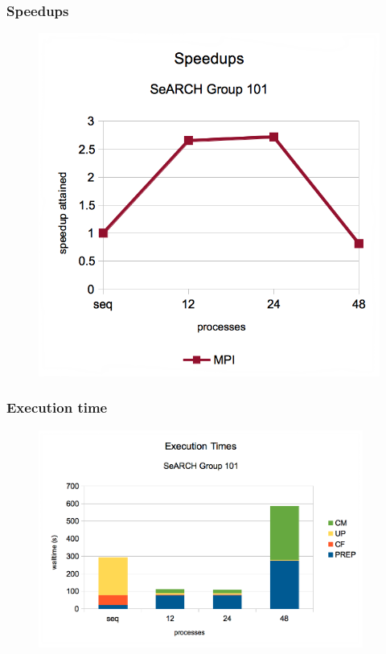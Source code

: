 \documentclass{beamer}
\begin{document}
\begin{frame}
	\frametitle{Speedups}
	\begin{figure}
		\begin{center}
			\includegraphics[height=\textheight]{images/may/speedups.png}
		\end{center}
	\end{figure}
\end{frame}




\begin{frame}
	\frametitle{Execution time}
	\begin{figure}
		\begin{center}
			\includegraphics[width=0.95\textwidth]{images/may/exectime.png}
		\end{center}
	\end{figure}
\end{frame}
\end{document}
